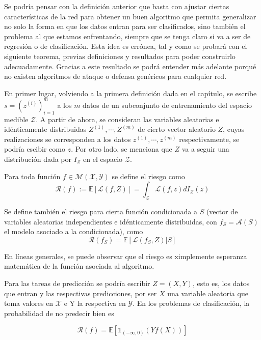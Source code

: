 Se podría pensar con la definición anterior que basta con ajustar ciertas características de la red para obtener un buen algoritmo que permita generalizar no solo la forma en que los datos entran para ser clasificados, sino también el problema al que estamos enfrentando, siempre que se tenga claro si va a ser de regresión o de clasificación. Esta idea es errónea, tal y como se probará con el siguiente teorema, previas definiciones y resultados para poder construirlo adecuadamente. Gracias a este resultado se podrá entender más adelante porqué no existen algoritmos de ataque o defensa genéricos para cualquier red.

En primer lugar, volviendo a la primera definición dada en el capítulo, se escribe $s=(z^{(i)})_{i=1}^{m}$ a los $m$ datos de un subconjunto de entrenamiento del espacio medible $\mathcal{Z}$. A partir de ahora, se consideran las variables aleatorias e idénticamente distribuidas $Z^{(1)},\cdots,Z^{(m)}$ de cierto vector aleatorio $Z$, cuyas realizaciones se corresponden a los datos $z^{(1)},\cdots,z^{(m)}$ respectivamente, se podría escibir como $z$. Por otro lado, se menciona que $Z$ va a seguir una distribución dada por $I_Z$ en el espacio $\mathcal{Z}$.

\begin{definicion} [Riesgo]

Para toda función $f \in \mathcal{M(X,Y)}$ se define el riesgo como $$\mathcal{R}(f):=\mathbb{E}[\mathcal{L}(f,Z)] = \int_{\mathcal{Z}}\mathcal{L}(f,z) dI_Z(z)$$

Se define también el riesgo para cierta función condicionada a $S$ (vector de variables aleatorias independientes e idénticamente distribuidas, con $f_S=\mathcal{A}(S)$ el modelo asociado a la condicionada), como  
$$\mathcal{R}(f_S)=\mathbb{E}[\mathcal{L}(f_S,Z)|S]$$

\end{definicion}

En líneas generales, se puede observar que el riesgo es ximplemente esperanza matemática de la función asociada al algoritmo.

Para las tareas de predicción se podría escribir $Z = (X,Y)$, esto es, los datos que entran y las respectivas predicciones, por ser $X$ una variable aleatoria que toma valores en $\mathcal{X}$ e Y la respectiva en $\mathcal{Y}$. En los problemas de clasificación, la probabilidad de no predecir bien es

$$\mathcal{R}(f) = \mathbb{E} \left[ \mathbb{1}_{(-\infty,0)} (Yf(X)) \right]$$ 

